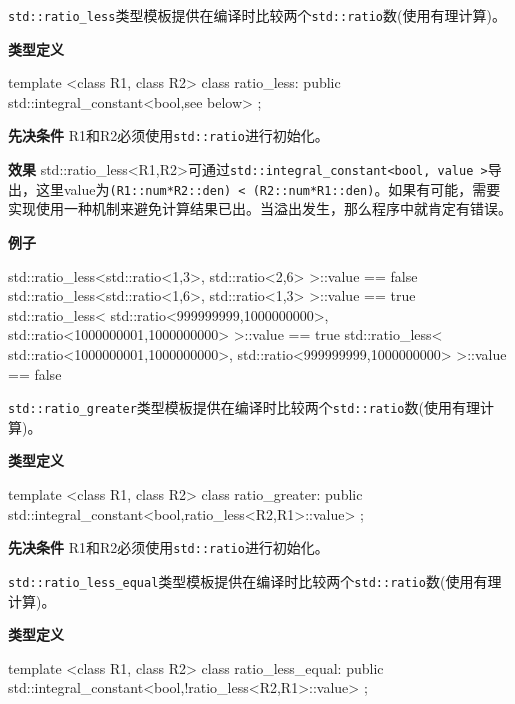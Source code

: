 
\texttt{std::ratio\_less}类型模板提供在编译时比较两个\texttt{std::ratio}数(使用有理计算)。

\textbf{类型定义}

\begin{cpp}
template <class R1, class R2>
class ratio_less:
  public std::integral_constant<bool,see below>
{};
\end{cpp}

\textbf{先决条件}
R1和R2必须使用\texttt{std::ratio}进行初始化。

\textbf{效果}
std::ratio\_less<R1,R2>可通过\texttt{std::integral\_constant<bool, value >}导出，这里value为\texttt{(R1::num*R2::den) < (R2::num*R1::den)}。如果有可能，需要实现使用一种机制来避免计算结果已出。当溢出发生，那么程序中就肯定有错误。

\textbf{例子}

\begin{cpp}
std::ratio_less<std::ratio<1,3>, std::ratio<2,6> >::value == false
std::ratio_less<std::ratio<1,6>, std::ratio<1,3> >::value == true
std::ratio_less<
  std::ratio<999999999,1000000000>,
  std::ratio<1000000001,1000000000> >::value == true
std::ratio_less<
  std::ratio<1000000001,1000000000>,
  std::ratio<999999999,1000000000> >::value == false
\end{cpp}


\texttt{std::ratio\_greater}类型模板提供在编译时比较两个\texttt{std::ratio}数(使用有理计算)。

\textbf{类型定义}

\begin{cpp}
template <class R1, class R2>
class ratio_greater:
  public std::integral_constant<bool,ratio_less<R2,R1>::value>
{};
\end{cpp}

\textbf{先决条件}
R1和R2必须使用\texttt{std::ratio}进行初始化。


\texttt{std::ratio\_less\_equal}类型模板提供在编译时比较两个\texttt{std::ratio}数(使用有理计算)。

\textbf{类型定义}

\begin{cpp}
template <class R1, class R2>
class ratio_less_equal:
  public std::integral_constant<bool,!ratio_less<R2,R1>::value>
{};
\end{cpp}

